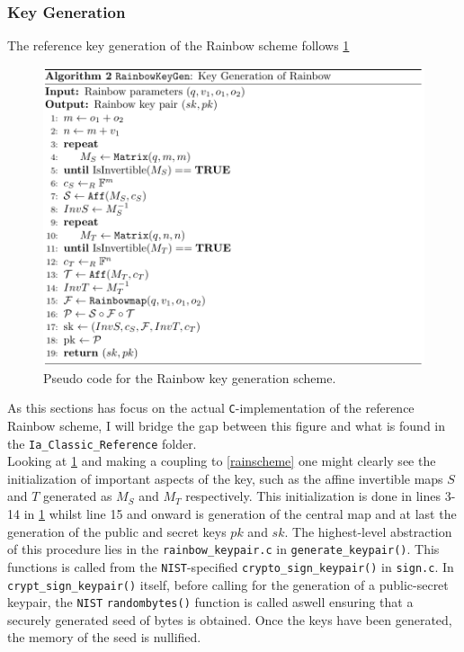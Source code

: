 \subsubsection{Key Generation} \label{section:keygen}
The reference key generation of the Rainbow scheme follows \cref{rainbowkeygen}
\begin{figure}[t]
    \centering
    \includegraphics[width=\textwidth]{resources/rainbowkeygen.png}
    \caption{Pseudo code for the Rainbow key generation scheme.}
    \label{rainbowkeygen}
\end{figure}
As this sections has focus on the actual \texttt{C}-implementation of the reference Rainbow scheme, I will bridge the gap between this figure and what is found in the \texttt{Ia\_Classic\_Reference} folder.\medskip\\
Looking at \cref{rainbowkeygen} and making a coupling to \cref{rainscheme} one might clearly see the initialization of important aspects of the key, such as the affine invertible maps $S$ and $T$ generated as $M_S$ and $M_T$ respectively. This initialization is done in lines 3-14 in \cref{rainbowkeygen} whilst line 15 and onward is generation of the central map and at last the generation of the public and secret keys $pk$ and $sk$. The highest-level abstraction of this procedure lies in the \texttt{rainbow\_keypair.c} in \texttt{generate\_keypair()}. This functions is called from the \texttt{NIST}-specified \texttt{crypto\_sign\_keypair()} in \texttt{sign.c}. In \texttt{crypt\_sign\_keypair()} itself, before calling for the generation of a public-secret keypair, the \texttt{NIST} \texttt{randombytes()} function is called aswell ensuring that a securely generated seed of bytes is obtained. Once the keys have been generated, the memory of the seed is nullified.\medskip\\
